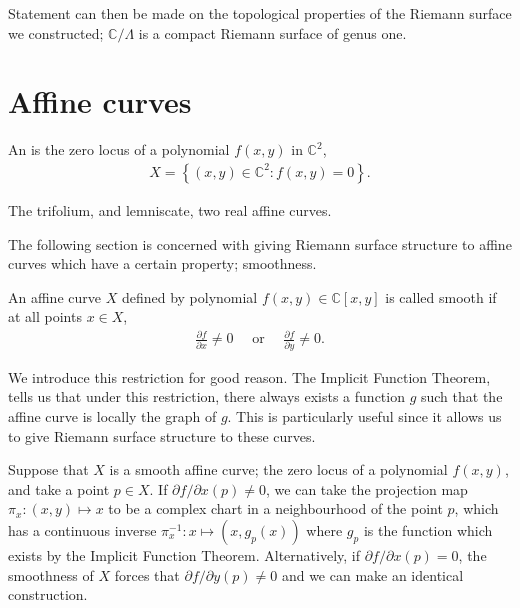 Statement can then be made on the topological properties of the Riemann surface
we constructed; $ \mathbb{C}/\Lambda $ is a compact Riemann surface of genus
one.

\section{Affine curves}\label{sec:affine-curves}
\begin{definition}
	An  is the zero locus of a polynomial $ f(x,y) $ in $
		\mathbb{C}^{2} $,
	\begin{align*}
		X = \left\{ (x,y) \in \mathbb{C}^{2}: f(x,y)=0 \right\}.
	\end{align*}
\end{definition}

\begin{marginfigure}
	\centering
	\caption{The trifolium, and lemniscate, two real affine curves.}
\end{marginfigure}


The following section is concerned with giving Riemann surface structure to
affine curves which have a certain property; smoothness.

\begin{definition}
	An affine curve $ X $ defined by polynomial $ f(x,y) \in \mathbb{C}[x,y] $
	is called smooth if at all points $ x \in X $, \begin{align*}
		\frac{\partial f}{\partial x} \neq 0 \quad \text{ or } \quad \frac{\partial
			f}{\partial y}\neq 0.
	\end{align*}
\end{definition}

We introduce this restriction for good reason. The Implicit Function
Theorem, tells us that under this
restriction, there always exists a function $ g $ such that the affine curve is
locally the graph of $ g $. This is particularly useful since it allows us to
give Riemann surface structure to these curves.

Suppose that $ X $ is a smooth affine curve; the zero locus of a polynomial $
	f(x,y) $, and take a point $ p \in X $. If $ \partial f/\partial x(p)
	\neq 0 $, we can take the projection map $ \pi_x:(x,y) \mapsto x $ to be a
complex chart in a neighbourhood of the point $ p $, which has a continuous
inverse $ \pi_x ^{-1}:x \mapsto (x,g_p(x)) $ where $ g_p $ is the function which
exists by the Implicit Function Theorem. Alternatively, if $ \partial f/\partial
	x(p)=0 $, the smoothness of $ X $ forces that $ \partial f/\partial y(p)\neq0
$ and we can make an identical construction.

